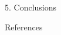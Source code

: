 \documentclass[12pt]{beamer}
\begin{document}
\begin{frame}[t]
\begin{columns}[t]
\begin{column}{0.30\textwidth}
\begin{block}{\Large 5. Conclusions}
				
			\end{block}
		
			
		
		
			\begin{block}{References}\justifying \vspace{12pt}\tiny
				
				
			\end{block}	
					
			\end{column}
		\end{columns}
	\end{frame}
\end{document}
